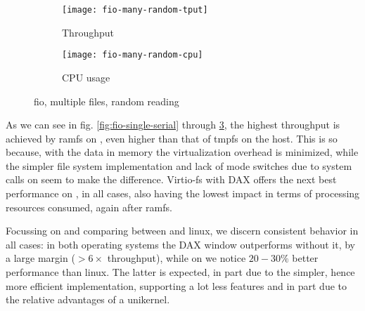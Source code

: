 \begin{figure}
    \begin{minipage}[c][\textheight]{\textwidth}
        \begin{subfigure}[c][0.5\textheight]{\textwidth}
            \caption{Throughput}
            \texttt{[image: fio-many-random-tput]}
            \label{fig:fio-many-random-tput}
        \end{subfigure}
        \begin{subfigure}[c][0.5\textheight]{\textwidth}
            \caption{CPU usage}
            \texttt{[image: fio-many-random-cpu]}
            \label{fig:fio-many-random-cpu}
        \end{subfigure}
        \caption{fio, multiple files, random reading}
        \label{fig:fio-many-random}
    \end{minipage}
\end{figure}


As we can see in fig. \ref{fig:fio-single-serial} through
\ref{fig:fio-many-random}, the highest throughput is achieved by ramfs on
\osv{}, even higher than that of tmpfs on the host. This is so because, with the
data in memory the virtualization overhead is minimized, while the simpler
file system implementation and lack of mode switches due to system calls on
\osv{} seem to make the difference. Virtio-fs with DAX offers the next best
performance on \osv{}, in all cases, also having the lowest impact in terms of
processing resources consumed, again after ramfs.

Focussing on \viofs{} and comparing between \osv{} and linux, we discern
consistent behavior in all cases: in both operating systems the DAX window
outperforms \viofs{} without it, by a large margin (\(> 6 \times\) throughput),
while on \osv{} we notice \(20 - 30 \%\) better performance than linux. The
latter is expected, in part due to the simpler, hence more efficient \osv{}
implementation, supporting a lot less features and in part due to the relative
advantages of a unikernel.

